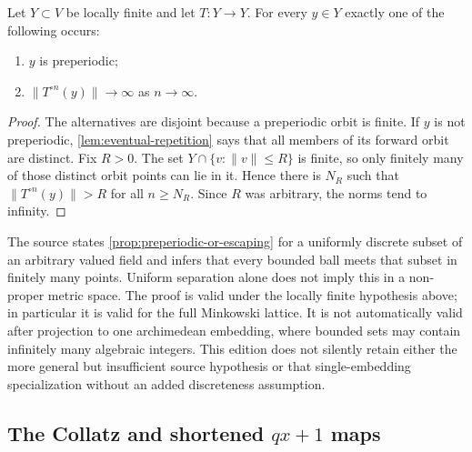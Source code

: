 \begin{proposition}
\label{prop:preperiodic-or-escaping}
Let $Y\subset V$ be locally finite and let $T:Y\to Y$.  For every $y\in Y$
exactly one of the following occurs:
\begin{enumerate}[label=\textup{(\roman*)}]
\item $y$ is preperiodic;
\item $\|T^{\circ n}(y)\|\to\infty$ as $n\to\infty$.
\end{enumerate}
\end{proposition}

\begin{proof}
The alternatives are disjoint because a preperiodic orbit is finite.  If
$y$ is not preperiodic, \cref{lem:eventual-repetition} says that all members
of its forward orbit are distinct.  Fix $R>0$.  The set
$Y\cap\{v:\|v\|\leq R\}$ is finite, so only finitely many of those distinct
orbit points can lie in it.  Hence there is $N_R$ such that
$\|T^{\circ n}(y)\|>R$ for all $n\geq N_R$.  Since $R$ was arbitrary, the
norms tend to infinity.
\end{proof}

\begin{sourceissue}
The source states \cref{prop:preperiodic-or-escaping} for a uniformly
discrete subset of an arbitrary valued field and infers that every bounded
ball meets that subset in finitely many points.  Uniform separation alone
does not imply this in a non-proper metric space.  The proof is valid under
the locally finite hypothesis above; in particular it is valid for the full
Minkowski lattice.  It is not automatically valid after projection to one
archimedean embedding, where bounded sets may contain infinitely many
algebraic integers.  This edition does not silently retain either the more
general but insufficient source hypothesis or that single-embedding
specialization without an added discreteness assumption.
\end{sourceissue}

\subsection{The Collatz and shortened
\texorpdfstring{$qx+1$}{qx+1} maps}


